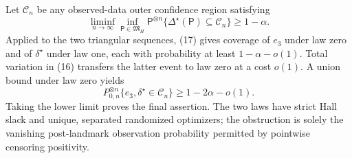 Let \(\mathcal C_n\) be any observed-data outer confidence region satisfying
\[
 \liminf_{n\to\infty}\inf_{\mathsf P\in\mathfrak M_H}
 \mathsf P^{\otimes n}\{\Delta^\star(\mathsf P)\subseteq\mathcal C_n\}
 \ge1-\alpha.                                           \tag{17}
\]
Applied to the two triangular sequences, (17) gives coverage of \(e_3\) under law zero and of \(\delta^\star\) under law one, each with probability at least \(1-\alpha-o(1)\).  Total variation in (16) transfers the latter event to law zero at a cost \(o(1)\).  A union bound under law zero yields
\[
 P_{0,n}^{\otimes n}\{e_3,\delta^\star\in\mathcal C_n\}
 \ge1-2\alpha-o(1).                                     \tag{18}
\]
Taking the lower limit proves the final assertion.  The two laws have strict Hall slack and unique, separated randomized optimizers; the obstruction is solely the vanishing post-landmark observation probability permitted by pointwise censoring positivity.
